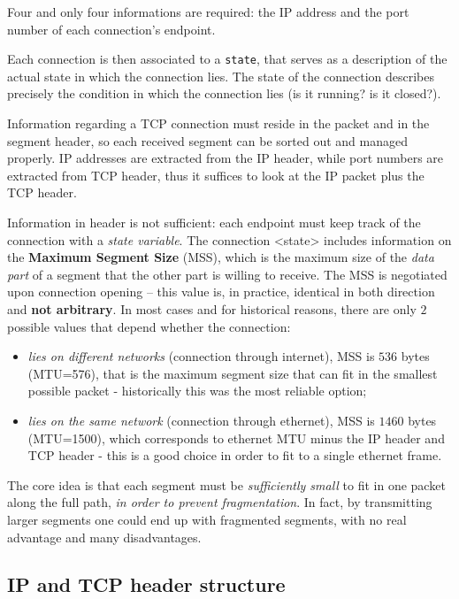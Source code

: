 \documentclass[10pt]{book}
\begin{document}
Four and only four informations are required: the IP address and the
port number of each connection's endpoint.

Each connection is then associated to a \texttt{state}, that serves as a
description of the actual state in which the connection lies. The state of the
connection describes precisely the condition in which the connection lies (is
it running? is it closed?).

Information regarding a TCP connection must reside in the packet and in the segment
header, so each received segment can be sorted out and managed properly. IP
addresses are extracted from the IP header, while port numbers are extracted
from TCP header, thus it suffices to look at the IP packet plus the TCP header.

Information in header is not sufficient: each endpoint must keep track of the
connection with a \emph{state variable}. The connection <state> includes
information on the \textbf{Maximum Segment Size} (MSS), which is the maximum
size of the \emph{data part} of a segment that the other part is willing to
receive. The MSS is negotiated upon connection opening \--- this value is, in
practice, identical in both direction and \textbf{not arbitrary}. In most
cases and for historical reasons, there are only $2$ possible values that
depend whether the connection:

\begin{itemize}
    \item \emph{lies on different networks} (connection through internet), MSS
        is $536$ bytes (MTU=576), that is the maximum segment size that can fit
        in the smallest possible packet \-- historically this was the most
        reliable option;
    \item \emph{lies on the same network} (connection through ethernet), MSS is
        $1460$ bytes (MTU=1500), which corresponds to ethernet MTU minus the IP
        header and TCP header \-- this is a good choice in order to fit to a
        single ethernet frame.
\end{itemize}

The core idea is that each segment must be \emph{sufficiently small} to fit in
one packet along the full path, \emph{in order to prevent fragmentation}. In
fact, by transmitting larger segments one could end up with fragmented
segments, with no real advantage and many disadvantages.

\subsection{IP and TCP header structure}
\end{document}
